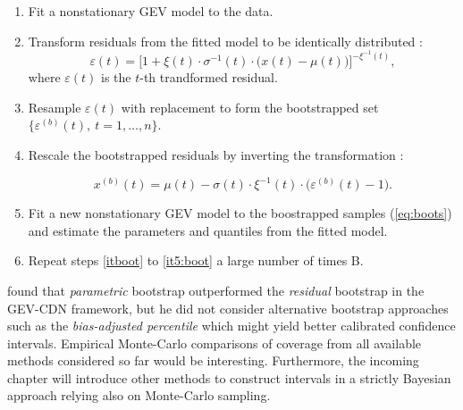 \begin{enumerate}
	\item\label{itboot} Fit a nonstationary GEV model to the data.
	\item Transform residuals from the fitted model to be identically distributed :
	\begin{equation*}
	\varepsilon(t)=\bigg[1+\xi(t)\cdot\sigma^{-1}(t)\cdot\Big(x(t)-\mu(t)\Big)\bigg]^{-\xi^{-1}(t)},
	\end{equation*}
	where $\varepsilon(t)$ is the $t$-th trandformed residual.
	
	\item Resample $\varepsilon(t)$ with replacement to form the bootstrapped set $\Big\{\varepsilon^{(b)}(t), \ t=1,\ldots,n\Big\}$.
	
	\item Rescale the bootstrapped residuals by inverting the transformation : 
	
	\begin{equation}\label{eq:boots}
	x^{(b)}(t)=\mu(t)-\sigma(t)\cdot\xi^{-1}(t)\cdot\Big(\varepsilon^{(b)}(t)-1\Big).
	\end{equation}
	\item\label{it5:boot} Fit a new nonstationary GEV  model to the boostrapped samples (\ref{eq:boots}) and estimate the parameters and quantiles from the fitted model. 
	\item Repeat steps \ref{itboot} to \ref{it5:boot} a large number of times B.
	
\end{enumerate}
\citet{cannon_flexible_2010} found that \emph{parametric} bootstrap outperformed the \emph{residual} bootstrap in the GEV-CDN framework, but he did not consider alternative bootstrap approaches such as the \emph{bias-adjusted percentile} which might yield better calibrated confidence intervals.
Empirical Monte-Carlo comparisons of coverage from all available methods considered so far would be interesting. Furthermore, the incoming chapter will introduce other methods to construct intervals in a strictly Bayesian approach  relying also on Monte-Carlo sampling.
